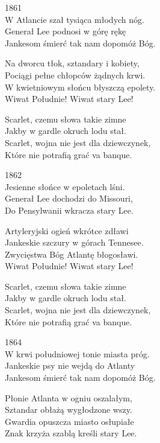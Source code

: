 \begin{text}
    1861\\
    W Atlancie szał tysiąca młodych nóg.\\
    Generał Lee podnosi w górę rękę\\
    Jankesom śmierć tak nam dopomóż Bóg.

    Na dworcu tłok, sztandary i kobiety,\\
    Pociągi pełne chłopców żądnych krwi.\\
    W kwietniowym słońcu błyszczą epolety.\\
    Wiwat Południe! Wiwat stary Lee!

    \vin Scarlet, czemu słowa takie zimne\\
    \vin Jakby w gardle okruch lodu stał.\\
    \vin Scarlet, wojna nie jest dla dziewczynek,\\
    \vin Które nie potrafią grać va banque.

    1862\\
    Jesienne słońce w epoletach lśni.\\
    Generał Lee dochodzi do Missouri,\\
    Do Pensylwanii wkracza stary Lee.

    Artyleryjski ogień wkrótce zdławi\\
    Jankeskie szczury w górach Tennesee.\\
    Zwycięstwa Bóg Atlantę błogosławi.\\
    Wiwat Południe! Wiwat stary Lee!

    \vin Scarlet, czemu słowa takie zimne\\
    \vin Jakby w gardle okruch lodu stał.\\
    \vin Scarlet, wojna nie jest dla dziewczynek,\\
    \vin Które nie potrafią grać va banque.

    1864\\
    W krwi południowej tonie miasta próg.\\
    Jankeskie psy nie wejdą do Atlanty\\
    Jankesom śmierć tak nam dopomóż Bóg.

    Płonie Atlanta w ogniu oszalałym,\\
    Sztandar obłażą wygłodzone wszy.\\
    Gwardia opuszcza miasto osłupiałe\\
    Znak krzyża szablą kreśli stary Lee.


\end{text}
